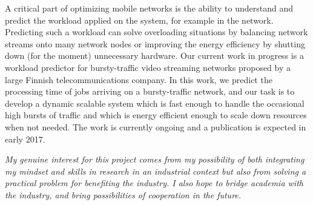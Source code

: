 \documentclass{article}
\begin{document}
A critical part of optimizing mobile networks is the ability to understand and predict the workload \cite{Zhu:08} applied on the system, for example in the network.
Predicting such a workload can solve overloading situations by balancing network streams onto many network nodes or improving the energy efficiency by shutting down (for the moment) unnecessary hardware.
Our current work in progress is a workload predictor for bursty-traffic video streaming networks proposed by a large Finnish telecommunications company.
In this work, we predict the processing time of jobs arriving on a bursty-traffic network, and our task is to develop a dynamic scalable system which is fast enough to handle the occasional high bursts of traffic and which is energy efficient enough to scale down resources when not needed.
The work is currently ongoing and a publication is expected in early 2017. \vspace{0.3cm}

\textit{My genuine interest for this project comes from my possibility of both integrating my mindset and skills in research in an industrial context but also from solving a practical problem for benefiting the industry. I also hope to bridge academia with the industry, and bring possibilities of cooperation in the future.}


{\footnotesize
}

\end{document}
